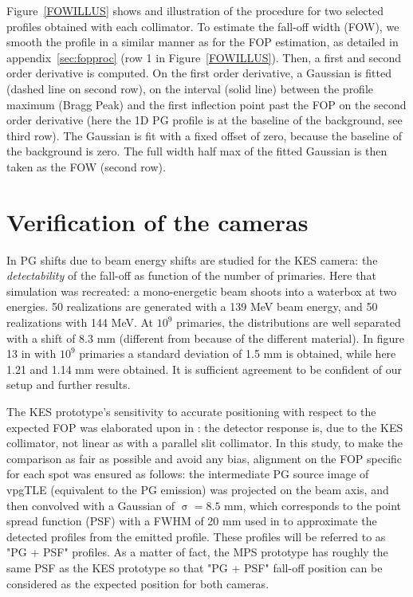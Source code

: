 \documentclass[a4paper,english,12pt]{article}
\begin{document}
Figure~\ref{FOWILLUS} shows and illustration of the procedure for two selected profiles obtained with each collimator. To estimate the fall-off width (FOW), we smooth the profile in a similar manner as for the FOP estimation, as detailed in appendix~\ref{sec:fopproc} (row 1 in Figure~\ref{FOWILLUS}). Then, a first and second order derivative is computed. On the first order derivative, a Gaussian is fitted (dashed line on second row), on the interval (solid line) between the profile maximum (Bragg Peak) and the first inflection point past the FOP on the second order derivative (here the 1D PG profile is at the baseline of the background, see third row). The Gaussian is fit with a fixed offset of zero, because the baseline of the background is zero. The full width half max of the fitted Gaussian is then taken as the FOW (second row).


\section{Verification of the cameras}

In \cite{Priegnitz2015} PG shifts due to beam energy shifts are studied for the KES camera: the \emph{detectability} of the fall-off as function of the number of primaries. Here that simulation was recreated: a mono-energetic beam shoots into a waterbox at two energies. 50 realizations are generated with a 139 MeV beam energy, and 50 realizations with 144 MeV. At $10^9$ primaries, the distributions are well separated with a shift of 8.3 mm (different from \cite{Priegnitz2015} because of the different material). In figure 13 in \cite{Perali2014} with $10^9$ primaries a standard deviation of 1.5 mm is obtained, while here 1.21 and 1.14 mm were obtained. It is sufficient agreement to be confident of our setup and further results.

The KES prototype's sensitivity to accurate positioning with respect to the expected FOP was elaborated upon in \citet[Section IV.A.3]{Sterpin2015}: the detector response is, due to the KES collimator, not linear as with a parallel slit collimator. In this study, to make the comparison as fair as possible and avoid any bias, alignment on the FOP specific for each spot was ensured as follows: the intermediate PG source image of vpgTLE (equivalent to the PG emission) was projected on the beam axis, and then convolved with a Gaussian of $\upsigma = 8.5$ mm, which corresponds to the point spread function (PSF) with a FWHM of 20 mm used in \cite{Priegnitz2015} to approximate the detected profiles from the emitted profile. These profiles will be referred to as "PG + PSF" profiles. As a matter of fact, the MPS prototype has roughly the same PSF as the KES prototype so that "PG + PSF" fall-off position can be considered as the expected position for both cameras.
\end{document}
